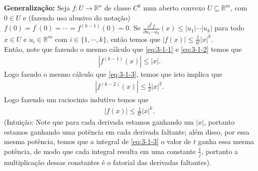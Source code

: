 \begin{homeworkProblem}[Seção 3-1]
\begin{solution}
    \textbf{Generalização:} Seja $f:U\to\mathbb{R}^{n}$ de classe $C^{k}$ num aberto convexo $U\subseteq \mathbb{R}^{m}$, com $0\in U$ e (fazendo uso abusivo do notação) $f(0)=f^{\prime}(0)=\cdots=f^{(k-1)}(0)=0$. Se $\frac{\partial^{k}f }{\partial u_1\cdots u_k}(x)\leq |u_1|\cdots|u_k|$ para todo $x\in U$ e $u_i\in\mathbb{R}^{m}$ com $i\in\{1,\cdots,k\}$, então temos que $|f(x)|\leq \frac{1}{k!}|x|^{k}$.\\
      Então, note que fazendo o mesmo cálculo que \eqref{eq:3-1-1} e \eqref{eq:3-1-2} temos que
      \begin{align*}
        |f^{(k-1)}(x)|\leq |x|.
      \end{align*}
      Logo faendo o mesmo cálculo que \eqref{eq:3-1-3}, temos que isto implica que
      \begin{align*}
        |f^{(k-2)}(x)|\leq \frac{1}{2}|x|^{2}.
      \end{align*}
      Logo fazendo um raciocinio indutívo temos que
      \begin{align*}
        |f(x)|\leq\frac{1}{k!}|x|^{k}.
      \end{align*}
      (Intuição: Note que para cada derivada estamos ganhando um $|x|$, portanto estamos ganhando uma potência em cada derivada faltante; além disso, por essa mesma potência, temos que a integral de \eqref{eq:3-1-3} o valor de $t$ ganha essa mesma potência, de modo que cada integral resulta em uma constante $\frac{1}{j}$, portanto a multiplicação dessas constantes é o fatorial das derivadas faltantes).
  \end{solution}
\end{homeworkProblem}
